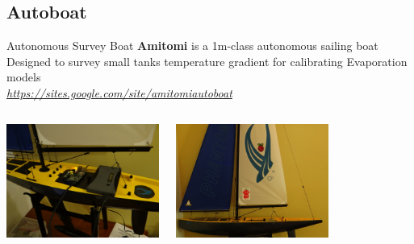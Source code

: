 \documentclass[aspectratio=169,unknownkeysallowed,xcolor=dvipsnames,beamer]{beamer} %
\begin{document}
\subsection{Autoboat}
\begin{frame}[fragile]{Autonomous Survey Boat}
\textbf{Amitomi} is a 1m-class autonomous sailing boat\\
Designed to survey small tanks temperature gradient for calibrating Evaporation models\\
\vspace{5mm}
{\it \href{https://sites.google.com/site/amitomiautoboat}
{https://sites.google.com/site/amitomiautoboat}}
\begin{columns}
\begin{center}
 \includegraphics[width=5cm]{sailbot000}
\end{center}
\begin{center}
 \includegraphics[width=5cm]{sailbot001}
\end{center}
\end{columns}
\end{frame}

{
\begin{frame}[plain]
\end{frame}}
\end{document}
